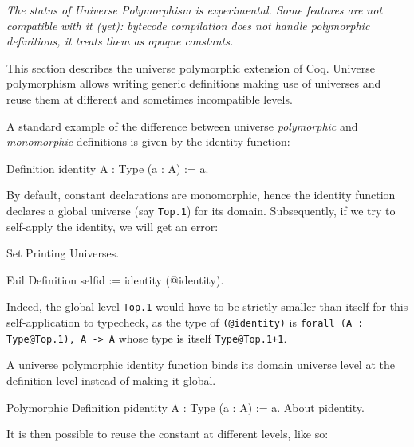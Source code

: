 
\label{Universes-full}


\begin{flushleft}
  \em The status of Universe Polymorphism is experimental. Some features
  are not compatible with it (yet): bytecode compilation does not handle
  polymorphic definitions, it treats them as opaque constants.
\end{flushleft}

This section describes the universe polymorphic extension of Coq.
Universe polymorphism allows writing generic definitions making use of
universes and reuse them at different and sometimes incompatible levels.

A standard example of the difference between universe \emph{polymorphic} and
\emph{monomorphic} definitions is given by the identity function:

\begin{coq_example*}
Definition identity {A : Type} (a : A) := a.
\end{coq_example*}

By default, constant declarations are monomorphic, hence the identity
function declares a global universe (say \texttt{Top.1}) for its
domain. Subsequently, if we try to self-apply the identity, we will get
an error:

\begin{coq_eval}
Set Printing Universes.
\end{coq_eval}
\begin{coq_example}
Fail Definition selfid := identity (@identity).
\end{coq_example}

Indeed, the global level \texttt{Top.1} would have to be strictly smaller than itself
for this self-application to typecheck, as the type of \texttt{(@identity)} is
\texttt{forall (A : Type@{Top.1}), A -> A} whose type is itself \texttt{Type@{Top.1+1}}.

A universe polymorphic identity function binds its domain universe level
at the definition level instead of making it global.

\begin{coq_example}
Polymorphic Definition pidentity {A : Type} (a : A) := a.
About pidentity.
\end{coq_example}

It is then possible to reuse the constant at different levels, like so:

